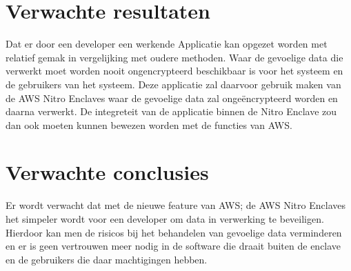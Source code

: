 \section{Verwachte resultaten}
\label{sec:verwachte_resultaten}
Dat er door een developer een werkende Applicatie kan opgezet worden met relatief gemak in vergelijking met oudere methoden. Waar de gevoelige data die verwerkt moet worden nooit ongencrypteerd beschikbaar is voor het systeem en de gebruikers van het systeem. Deze applicatie zal daarvoor gebruik maken van de AWS Nitro Enclaves waar de gevoelige data zal ongeëncrypteerd worden en daarna verwerkt. De integreteit van de applicatie binnen de Nitro Enclave zou dan ook moeten kunnen bewezen worden met de functies van AWS.

\section{Verwachte conclusies}
\label{sec:verwachte_conclusies}
Er wordt verwacht dat met de nieuwe feature van AWS; de AWS Nitro Enclaves het simpeler wordt voor een developer om data in verwerking te beveiligen. Hierdoor kan men de risicos bij het behandelen van gevoelige data verminderen en er is geen vertrouwen meer nodig in de software die draait buiten de enclave en de gebruikers die daar machtigingen hebben.


